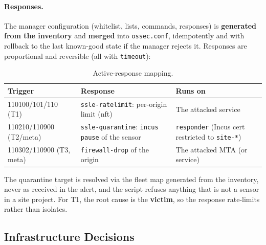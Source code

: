 \documentclass[11pt,a4paper]{article}
\begin{document}
\paragraph{Responses.}
The manager configuration (whitelist, lists, commands, responses) is \textbf{generated from
the inventory} and \textbf{merged} into \texttt{ossec.conf}, idempotently and with rollback
to the last known-good state if the manager rejects it. Responses are proportional and
reversible (all with \texttt{timeout}):

\begin{table}[H]
  \centering
  \caption{Active-response mapping.}
  \label{tab:responses}
  \small
  \begin{tabular}{@{}p{3.2cm}p{5cm}p{4.8cm}@{}}
    \toprule
    \textbf{Trigger} & \textbf{Response} & \textbf{Runs on} \\
    \midrule
    110100/101/110 (T1) & \texttt{ssle-ratelimit}: per-origin limit (nft) &
      The attacked service \\
    110210/110900 (T2/meta) & \texttt{ssle-quarantine}: \texttt{incus pause} of the sensor &
      \texttt{responder} (Incus cert restricted to \texttt{site-*}) \\
    110302/110900 (T3, meta) & \texttt{firewall-drop} of the origin &
      The attacked MTA (or service) \\
    \bottomrule
  \end{tabular}
\end{table}

The quarantine target is resolved via the fleet map generated from the inventory, never as
received in the alert, and the script refuses anything that is not a sensor in a site
project. For T1, the root cause is the \textbf{victim}, so the response rate-limits rather
than isolates.

\subsection{Infrastructure Decisions}
\end{document}
